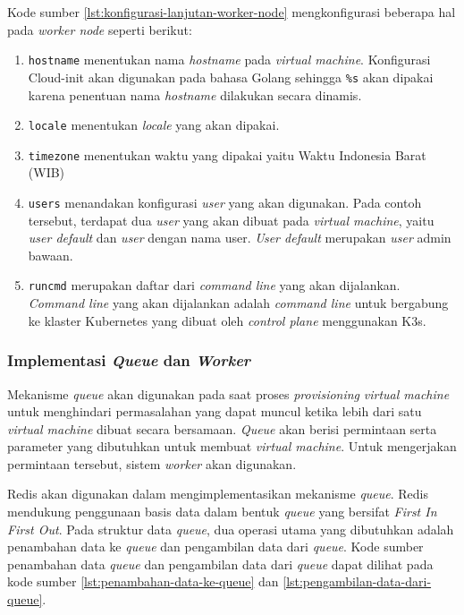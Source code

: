 Kode sumber \ref{lst:konfigurasi-lanjutan-worker-node}
mengkonfigurasi beberapa hal pada \emph{worker node} seperti berikut:

\begin{enumerate}
  
  \item \lstinline{hostname} menentukan nama \emph{hostname} pada \emph{virtual machine}.
    Konfigurasi Cloud-init akan digunakan pada bahasa Golang sehingga \lstinline{%s}
    akan dipakai karena penentuan nama \emph{hostname} dilakukan secara dinamis.

  \item \lstinline{locale} menentukan \emph{locale} yang akan dipakai.

  \item \lstinline{timezone} menentukan waktu yang dipakai yaitu Waktu Indonesia Barat (WIB)

  \item \lstinline{users} menandakan konfigurasi \emph{user} yang akan digunakan. Pada
    contoh tersebut, terdapat dua \emph{user} yang akan dibuat pada \emph{virtual machine},
    yaitu \emph{user default} dan \emph{user} dengan nama user. \emph{User default} merupakan
    \emph{user} admin bawaan.

  \item \lstinline{runcmd} merupakan daftar dari \emph{command line} yang akan dijalankan.
    \emph{Command line} yang akan dijalankan adalah \emph{command line} untuk bergabung ke
    klaster Kubernetes yang dibuat oleh \emph{control plane} menggunakan K3s.

\end{enumerate}

\subsubsection{Implementasi \emph{Queue} dan \emph{Worker}}
\label{sec:implementasi-queue-dan-worker}

Mekanisme \emph{queue} akan digunakan pada saat proses \emph{provisioning}
\emph{virtual machine} untuk menghindari permasalahan yang dapat muncul ketika
lebih dari satu \emph{virtual machine} dibuat secara bersamaan. \emph{Queue}
akan berisi permintaan serta parameter yang dibutuhkan untuk membuat
\emph{virtual machine}. Untuk mengerjakan permintaan tersebut, sistem \emph{worker}
akan digunakan.

Redis akan digunakan dalam mengimplementasikan mekanisme \emph{queue}. Redis mendukung
penggunaan basis data dalam bentuk \emph{queue} yang bersifat \emph{First In First Out}.
Pada struktur data \emph{queue}, dua operasi utama yang dibutuhkan adalah penambahan data
ke \emph{queue} dan pengambilan data dari \emph{queue}. Kode sumber penambahan data \emph{queue}
dan pengambilan data dari \emph{queue} dapat dilihat pada kode sumber
\ref{lst:penambahan-data-ke-queue} dan \ref{lst:pengambilan-data-dari-queue}.

